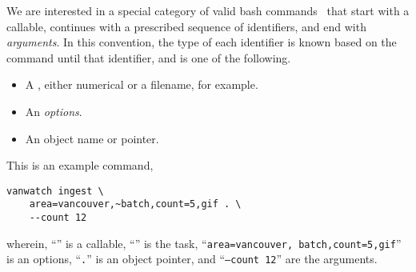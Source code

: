 We are interested in a special category of valid bash commands~\cite{shell_syntax} that start with a callable, continues with a prescribed sequence of identifiers, and end with \emph{arguments}. In this convention, the type of each identifier is known based on the command until that identifier, and is one of the following.
%
\begin{itemize}
    \item A , either numerical or a filename, for example.
    \item An \emph{options}.
    \item An object name or pointer.
\end{itemize}
%
This is an example command,
%
\begin{verbatim}
vanwatch ingest \
    area=vancouver,~batch,count=5,gif . \
    --count 12
\end{verbatim}
%
wherein, ``'' is a callable, ``'' is the task, ``\texttt{area=vancouver,~batch,count=5,gif}'' is an options, ``\texttt{.}'' is an object pointer, and ``\texttt{--count 12}'' are the arguments.